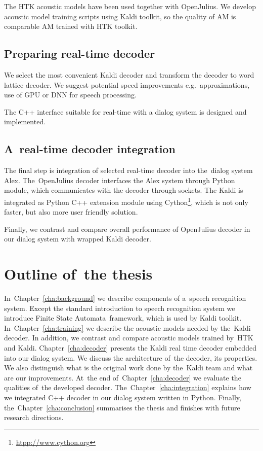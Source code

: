 The \ac{HTK} acoustic models have been used together with OpenJulius. 
We develop acoustic model training scripts using Kaldi toolkit,
so the quality of \ac{AM} is comparable \ac{AM} trained with \ac{HTK} toolkit. 

 

\subsection{Preparing real-time decoder} 
\label{sub:compare_rt}

We select the most convenient Kaldi decoder and transform the decoder to word lattice decoder. 
We suggest potential speed improvements e.g.\ approximations, use of \ac{GPU} or \ac{DNN} for speech processing.

The C++ interface suitable for real-time with a dialog system is designed and implemented.

\subsection{A~real-time decoder integration} 
\label{sub:integration}
The final step is integration of selected real-time decoder into the~dialog system Alex.
The~OpenJulius decoder interfaces the Alex system through Python module, 
which communicates with the decoder through sockets.
The Kaldi is integrated as Python C++ extension module 
using Cython\footnote{\url{htpp://www.cython.org}}, 
which is not only faster, but also more user friendly solution.

Finally, we contrast and compare overall performance of OpenJulius decoder 
in our dialog system with wrapped Kaldi decoder.


\section{Outline of~the thesis} 
\label{sec:outline_of_the_thesis}
In~Chapter~\ref{cha:background} we describe components of a~speech recognition system.  
Except the standard introduction to speech recognition system we introduce Finite State Automata~framework,
which is used by Kaldi toolkit. In~Chapter~\ref{cha:training} we describe the acoustic 
models needed by the~Kaldi decoder. 
In addition, we contrast and compare acoustic models trained by~\ac{HTK} and Kaldi. 
Chapter~\ref{cha:decoder} presents the Kaldi real time decoder embedded into our dialog system.
We discuss the architecture of~the decoder, its properties. We also distinguish what is the original work done by 
the~Kaldi team and what are our improvements. At~the end of~Chapter~\ref{cha:decoder} 
we evaluate the qualities of~the developed decoder.
The~Chapter~\ref{cha:integration} explains how we integrated C++ decoder in our dialog system written in Python.
Finally, the~Chapter~\ref{cha:conclusion} summarises the thesis and finishes with future research directions.

